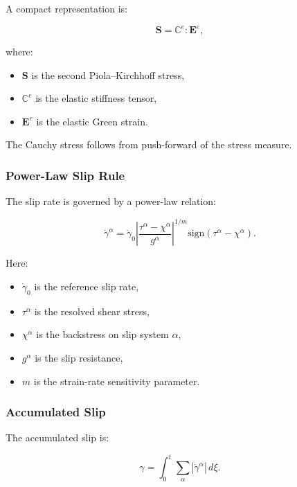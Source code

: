 \documentclass[11pt,a4paper]{article}
\begin{document}
A compact representation is:

\begin{equation}
\bm{S}
=
\mathbb{C}^e :
\bm{E}^e ,
\end{equation}

where:

\begin{itemize}
    \item $\bm{S}$ is the second Piola--Kirchhoff stress,
    \item $\mathbb{C}^e$ is the elastic stiffness tensor,
    \item $\bm{E}^e$ is the elastic Green strain.
\end{itemize}

The Cauchy stress follows from push-forward of the stress measure.

\subsubsection{Power-Law Slip Rule}

The slip rate is governed by a power-law relation:

\begin{equation}
\dot{\gamma}^{\alpha}
=
\dot{\gamma}_0
\left|
\frac{\tau^{\alpha}-\chi^{\alpha}}
{g^{\alpha}}
\right|^{1/m}
\text{sign}
(\tau^{\alpha}-\chi^{\alpha}) .
\end{equation}

Here:

\begin{itemize}
    \item $\dot{\gamma}_0$ is the reference slip rate,
    \item $\tau^{\alpha}$ is the resolved shear stress,
    \item $\chi^{\alpha}$ is the backstress on slip system $\alpha$,
    \item $g^{\alpha}$ is the slip resistance,
    \item $m$ is the strain-rate sensitivity parameter.
\end{itemize}

\subsubsection{Accumulated Slip}

The accumulated slip is:

\begin{equation}
\gamma
=
\int_0^t
\sum_{\alpha}
|\dot{\gamma}^{\alpha}|
\,d\xi .
\end{equation}
\end{document}
